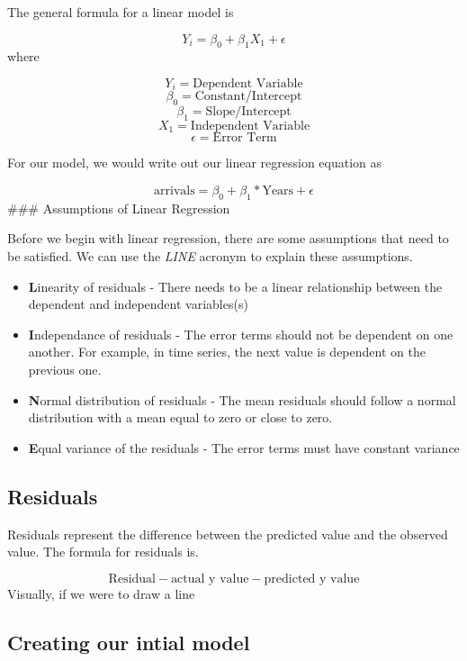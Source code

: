 \documentclass[
]{book}
\begin{document}
The general formula for a linear model is

\[Y_{i} = \beta_{0} + \beta_{1}X_{1} + \epsilon \]
where

\[Y_{i} = \text{Dependent Variable}\]
\[\beta_{0} = \text{Constant/Intercept}\]
\[\beta_{1} = \text{Slope/Intercept}\]
\[X_{1} = \text{Independent Variable}\]
\[\epsilon = \text{Error Term}\]

For our model, we would write out our linear regression equation as

\[\text{arrivals} = \beta_{0} + \beta_{1}*\text{Years} + \epsilon\]
\#\#\# Assumptions of Linear Regression

Before we begin with linear regression, there are some assumptions that need to be satisfied. We can use the \emph{LINE} acronym to explain these assumptions.

\begin{itemize}
\item
  \textbf{L}inearity of residuals - There needs to be a linear relationship between the dependent and independent variables(s)
\item
  \textbf{I}ndependance of residuals - The error terms should not be dependent on one another. For example, in time series, the next value is dependent on the previous one.
\item
  \textbf{N}ormal distribution of residuals - The mean residuals should follow a normal distribution with a mean equal to zero or close to zero.
\item
  \textbf{E}qual variance of the residuals - The error terms must have constant variance
\end{itemize}

\hypertarget{residuals}{%
\subsection{Residuals}\label{residuals}}

Residuals represent the difference between the predicted value and the observed value. The formula for residuals is.

\[\text{Residual} - \text{actual y value} - \text{predicted y value}\]
Visually, if we were to draw a line

\hypertarget{creating-our-intial-model}{%
\subsection{Creating our intial model}\label{creating-our-intial-model}}
\end{document}
